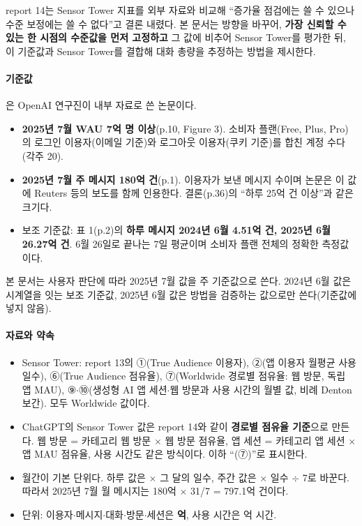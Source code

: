 \documentclass[11pt]{article}
\begin{document}
report 14는 Sensor Tower 지표를 외부 자료와 비교해 ``증가율 점검에는 쓸 수 있으나 수준 보정에는 쓸 수 없다''고 결론 내렸다. 본 문서는 방향을 바꾸어, \textbf{가장 신뢰할 수 있는 한 시점의 수준값을 먼저 고정하고} 그 값에 비추어 Sensor Tower를 평가한 뒤, 이 기준값과 Sensor Tower를 결합해 대화 총량을 추정하는 방법을 제시한다.

\paragraph{기준값} \textcite{chatterji-2025-how-people-use-chatgpt}은 OpenAI 연구진이 내부 자료로 쓴 논문이다.
\begin{itemize}
  \item \textbf{2025년 7월 WAU 7억 명 이상}(p.10, Figure 3). 소비자 플랜(Free, Plus, Pro)의 로그인 이용자(이메일 기준)와 로그아웃 이용자(쿠키 기준)를 합친 계정 수다(각주 20).
  \item \textbf{2025년 7월 주 메시지 180억 건}(p.1). 이용자가 보낸 메시지 수이며 논문은 이 값에 Reuters 등의 보도를 함께 인용한다. 결론(p.36)의 ``하루 25억 건 이상''과 같은 크기다.
  \item 보조 기준값: 표 1(p.2)의 \textbf{하루 메시지 2024년 6월 4.51억 건, 2025년 6월 26.27억 건}. 6월 26일로 끝나는 7일 평균이며 소비자 플랜 전체의 정확한 측정값이다.
\end{itemize}
본 문서는 사용자 판단에 따라 2025년 7월 값을 주 기준값으로 쓴다. 2024년 6월 값은 시계열을 잇는 보조 기준값, 2025년 6월 값은 방법을 검증하는 값으로만 쓴다(기준값에 넣지 않음).

\paragraph{자료와 약속}
\begin{itemize}
  \item Sensor Tower: report 13의 ①(True Audience 이용자), ②(앱 이용자 월평균 사용 일수), ⑥(True Audience 점유율), ⑦(Worldwide 경로별 점유율: 웹 방문, 독립 앱 MAU), ⑨$\cdot$⑩(생성형 AI 앱 세션$\cdot$웹 방문과 사용 시간의 월별 값, 비례 Denton 보간). 모두 Worldwide 값이다.
  \item ChatGPT의 Sensor Tower 값은 report 14와 같이 \textbf{경로별 점유율 기준}으로 만든다. 웹 방문 = 카테고리 웹 방문 $\times$ 웹 방문 점유율, 앱 세션 = 카테고리 앱 세션 $\times$ 앱 MAU 점유율, 사용 시간도 같은 방식이다. 이하 ``(⑦)''로 표시한다.
  \item 월간이 기본 단위다. 하루 값은 $\times$ 그 달의 일수, 주간 값은 $\times$ 일수 $\div$ 7로 바꾼다. 따라서 2025년 7월 월 메시지는 180억 $\times$ 31/7 = 797.1억 건이다.
  \item 단위: 이용자$\cdot$메시지$\cdot$대화$\cdot$방문$\cdot$세션은 \textbf{억}, 사용 시간은 억 시간.
\end{itemize}
\end{document}
